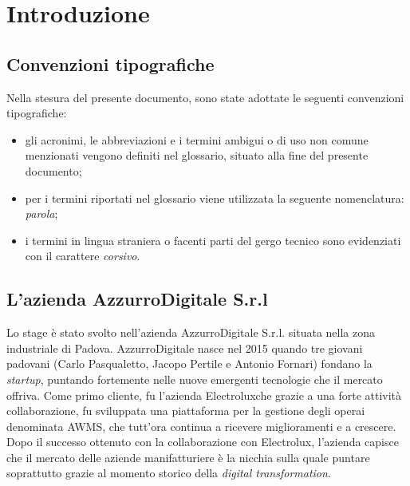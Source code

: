 
\chapter{Introduzione}
\label{cap:introduzione}

\section{Convenzioni tipografiche}
Nella stesura del presente documento, sono state adottate le seguenti convenzioni tipografiche:
\begin{itemize}
	\item gli acronimi, le abbreviazioni e i termini ambigui o di uso non comune menzionati vengono definiti nel glossario, situato alla fine del presente documento;
	\item per i termini riportati nel glossario viene utilizzata la seguente nomenclatura: \emph{parola}\glsfirstoccur;
	\item i termini in lingua straniera o facenti parti del gergo tecnico sono evidenziati con il carattere \emph{corsivo}.
\end{itemize}




\section{L'azienda AzzurroDigitale S.r.l}

Lo stage è stato svolto nell'azienda AzzurroDigitale S.r.l. situata nella zona industriale di Padova. AzzurroDigitale nasce nel 2015 quando tre giovani padovani (Carlo Pasqualetto, Jacopo Pertile e Antonio Fornari) fondano la \emph{startup}, puntando fortemente nelle nuove emergenti tecnologie che il mercato offriva. Come primo cliente, fu l'azienda 	\gls{Electrolux}\glsfirstoccur che grazie a una forte attività collaborazione, fu sviluppata una piattaforma per la gestione degli operai denominata \gls{AWMS}\glsfirstoccur, che tutt’ora continua a ricevere miglioramenti e a crescere. Dopo il successo ottenuto con la collaborazione con \gls{Electrolux}\ap{[g]}, l'azienda capisce che il mercato delle aziende manifatturiere è la nicchia sulla quale puntare soprattutto grazie al momento storico della \emph{digital transformation}. 

